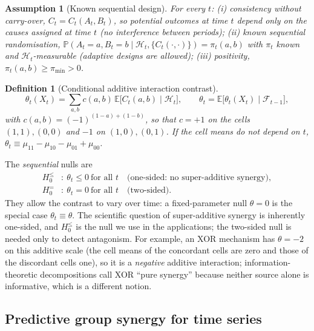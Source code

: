 \documentclass[pdflatex,sn-mathphys-ay]{sn-jnl}%
\theoremstyle{thmstyleone}%
\theoremstyle{thmstyletwo}%
\theoremstyle{thmstylethree}%
\newtheorem{definition}{Definition}%
\newtheorem{assumption}{Assumption}%
\newcommand{\E}{\mathbb{E}}
\newcommand{\Prob}{\mathbb{P}}
\newcommand{\F}{\mathcal{F}}
\begin{document}
\begin{assumption}[Known sequential design]\label{ass:design}
For every $t$: (i) \emph{consistency without carry-over}, $C_t=C_t(A_t,B_t)$, so potential outcomes at time $t$ depend only on the causes assigned at time $t$ (no interference between periods); (ii) \emph{known sequential
randomisation}, $\Prob(A_t=a,B_t=b\mid\mathcal H_t,\{C_t(\cdot,\cdot)\})=\pi_t(a,b)$ with
$\pi_t$ known and $\mathcal H_t$-measurable (adaptive designs are allowed); (iii)
\emph{positivity}, $\pi_t(a,b)\ge\pi_{\min}>0$.
\end{assumption}

\begin{definition}[Conditional additive interaction contrast]\label{def:theta}
\[
\theta_t(X_t)=\sum_{a,b}c(a,b)\,\E\big[C_t(a,b)\mid\mathcal H_t\big],\qquad
\theta_t=\E\big[\theta_t(X_t)\mid\F_{t-1}\big],
\]
with $c(a,b)=(-1)^{(1-a)+(1-b)}$, so that $c=+1$ on the cells $(1,1),(0,0)$ and $-1$ on
$(1,0),(0,1)$. If the cell means do not depend on $t$, $\theta_t\equiv
\mu_{11}-\mu_{10}-\mu_{01}+\mu_{00}$.
\end{definition}

The \emph{sequential} nulls are
\begin{align*}
H_0^{\le}&:\ \theta_t\le0\ \text{for all }t \quad\text{(one-sided: no super-additive synergy)},\\
H_0^{=}&:\ \theta_t=0\ \text{for all }t \quad\text{(two-sided)}.
\end{align*}
They allow the contrast to vary over time: a fixed-parameter null $\theta=0$ is the special
case $\theta_t\equiv\theta$. The scientific question of super-additive synergy is
inherently one-sided, and $H_0^{\le}$ is the null we use in the applications; the
two-sided null is needed only to detect antagonism. For example, an XOR mechanism has $\theta=-2$ on this additive scale (the cell means of the concordant cells are zero and those of the discordant cells one), so it is a \emph{negative} additive interaction; information-theoretic decompositions call XOR ``pure synergy'' because neither source alone is informative, which is a different notion.

\subsection{Predictive group synergy for time series}\label{subsec:setup-granger}
\end{document}
